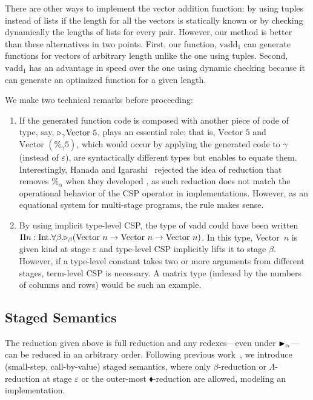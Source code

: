 There are other ways to implement the vector addition function:
by using tuples instead of lists if the length
for all the vectors is statically known or by checking dynamically the
lengths of lists for every pair.  However, our method is better than
these alternatives in two points.  First, our function, $\text{vadd}_1$
can generate functions for vectors of arbitrary length unlike the one
using tuples.  Second, $\text{vadd}_1$ has an advantage in speed over
the one using dynamic checking because it can generate an optimized
function for a given length.

We make two technical remarks before proceeding:
\begin{enumerate}
\item If the generated function code is composed with another piece of code of type, say,
\({\mathop{\triangleright}}_\gamma \text{Vector }5\), \QPercent{} plays an essential role; that is,
\(\text{Vector }5\) and \(\text{Vector }(\%_\gamma 5)\), which would occur
by applying the generated code to \(\gamma\) (instead of \(\varepsilon\)), are syntactically
different types but \QPercent{} enables to equate them.
Interestingly, Hanada and Igarashi~\cite{Hanada2014} rejected the idea of
reduction that removes $\%_\alpha$ when they developed \LTP{}, as such
reduction does not match the operational behavior of the CSP operator in
implementations. However, as an equational system for multi-stage programs,
the rule \QPercent{} makes sense.
\item \renewcommand{\Vpn}{\text{Vector}\ n}
By using implicit type-level CSP, the type of vadd
could have been written
\(\Pi n:\I.\F\beta.\TW_\beta(\Vpn\to\Vpn\to\Vpn)\).  In this type,
Vector\ $n$ is given kind at stage \(\varepsilon\) and type-level CSP
implicitly lifts it to stage \(\beta\).  However, if a type-level
constant takes two or more arguments from different stages, term-level
CSP is necessary.  A matrix type (indexed by the numbers of columns
and rows) would be such an example.
\end{enumerate}


\subsection{Staged Semantics}

The reduction given above is full reduction and any redexes---even
under ${\mathop{\blacktriangleright}}_\alpha$---can be reduced in an arbitrary order.
Following previous work~\cite{Hanada2014},
we introduce (small-step, call-by-value) staged semantics,
where only $\beta$-reduction or $\Lambda$-reduction at stage $\varepsilon$ or the outer-most $\blacklozenge$-reduction are allowed,
modeling an implementation.

